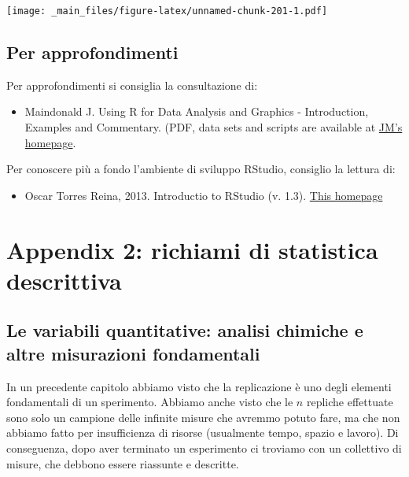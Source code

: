 \documentclass[a4paper,12pt,oneside]{book}
\providecommand{\tightlist}{%
  \setlength{\itemsep}{0pt}\setlength{\parskip}{0pt}}
\theoremstyle{definition}
\theoremstyle{definition}
\theoremstyle{definition}
\theoremstyle{remark}
\begin{document}
\texttt{[image: \_main\_files/figure-latex/unnamed-chunk-201-1.pdf]}

\section*{Per approfondimenti}\label{per-approfondimenti-2}

Per approfondimenti si consiglia la consultazione di:

\begin{itemize}
\tightlist
\item
  Maindonald J. Using R for Data Analysis and Graphics - Introduction,
  Examples and Commentary. (PDF, data sets and scripts are available at
  \href{https://cran.r-project.org/doc/contrib/usingR.pdff}{JM's
  homepage}.
\end{itemize}

Per conoscere più a fondo l'ambiente di sviluppo RStudio, consiglio la
lettura di:

\begin{itemize}
\tightlist
\item
  Oscar Torres Reina, 2013. Introductio to RStudio (v. 1.3).
  \href{https://dss.princeton.edu/training/RStudio101.pdf}{This
  homepage}
\end{itemize}

\chapter*{Appendix 2: richiami di statistica
descrittiva}\label{appendix-2-richiami-di-statistica-descrittiva}

\section*{Le variabili quantitative: analisi chimiche e altre
misurazioni
fondamentali}\label{le-variabili-quantitative-analisi-chimiche-e-altre-misurazioni-fondamentali}

In un precedente capitolo abbiamo visto che la replicazione è uno degli
elementi fondamentali di un sperimento. Abbiamo anche visto che le \(n\)
repliche effettuate sono solo un campione delle infinite misure che
avremmo potuto fare, ma che non abbiamo fatto per insufficienza di
risorse (usualmente tempo, spazio e lavoro). Di conseguenza, dopo aver
terminato un esperimento ci troviamo con un collettivo di misure, che
debbono essere riassunte e descritte.
\end{document}
